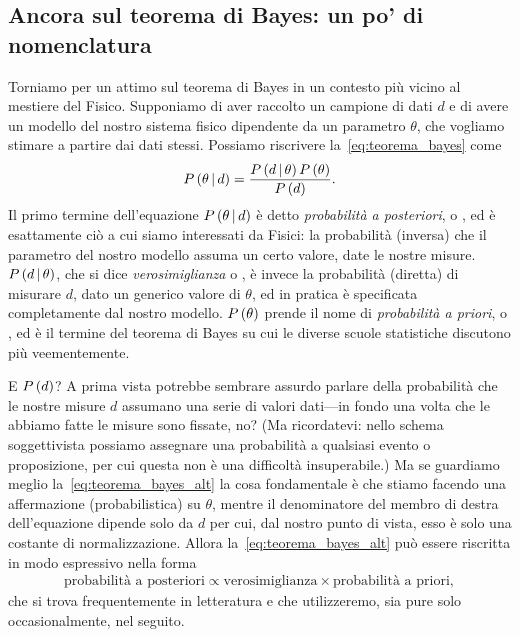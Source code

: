 \subsection{Ancora sul teorema di Bayes: un po' di nomenclatura}
\label{sec:bayes_nomenclatura}

Torniamo per un attimo sul teorema di Bayes in un contesto più vicino al
mestiere del Fisico. Supponiamo di aver raccolto un campione di dati $d$
e di avere un modello del nostro sistema fisico dipendente da un parametro
$\theta$, che vogliamo stimare a partire dai dati stessi. Possiamo riscrivere
la~\eqref{eq:teorema_bayes} come
\begin{align}\label{eq:teorema_bayes_alt}
  \displaystyle P\left(\theta \,|\, d\right) = \frac{\displaystyle P\left(d \,|\, \theta\right) \displaystyle P\left(\theta\right)}{\displaystyle P\left(d\right)}.
\end{align}
Il primo termine dell'equazione $\displaystyle P\left(\theta \,|\, d\right)$ è detto
\emph{probabilità a posteriori}, o , ed è esattamente ciò
a cui siamo interessati da Fisici: la probabilità (inversa) che il parametro
del nostro modello assuma un certo valore, date le nostre misure.
$\displaystyle P\left(d \,|\, \theta\right)$, che si dice \emph{verosimiglianza} o ,
è invece la probabilità (diretta) di misurare $d$, dato un generico valore
di $\theta$, ed in pratica è specificata completamente dal nostro modello.
$\displaystyle P\left(\theta\right)$ prende il nome di \emph{probabilità a priori}, o ,
ed è il termine del teorema di Bayes su cui le diverse scuole statistiche
discutono più veementemente.

E $\displaystyle P\left(d\right)$? A prima vista potrebbe sembrare assurdo parlare della
probabilità che le nostre misure $d$ assumano una serie di valori dati---in
fondo una volta che le abbiamo fatte le misure sono fissate, no?
(Ma ricordatevi: nello schema soggettivista possiamo assegnare una probabilità
a qualsiasi evento o proposizione, per cui questa non è una difficoltà
insuperabile.) Ma se guardiamo meglio la~\eqref{eq:teorema_bayes_alt} la cosa
fondamentale è che stiamo facendo una affermazione (probabilistica) su
$\theta$, mentre il denominatore del membro di destra dell'equazione dipende
solo da $d$ per cui, dal nostro punto di vista, esso è solo una costante
di normalizzazione. Allora la~\eqref{eq:teorema_bayes_alt} può essere
riscritta in modo espressivo nella forma
\begin{align}
  \text{probabilità a posteriori} \propto
  \text{verosimiglianza} \times \text{probabilità a priori},
\end{align}
che si trova frequentemente in letteratura e che utilizzeremo, sia pure solo
occasionalmente, nel seguito.


